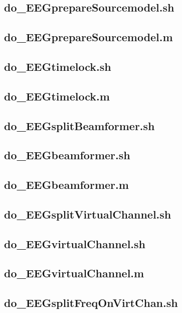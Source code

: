 \documentclass[12pt,a4paper]{scrartcl}
\begin{document}
\subsection{do\_EEGprepareSourcemodel.sh}
\label{sec:prepSM}

\subsection{do\_EEGprepareSourcemodel.m}

\subsection{do\_EEGtimelock.sh}
\label{sec:timelock}

\subsection{do\_EEGtimelock.m}

\subsection{do\_EEGsplitBeamformer.sh}
\label{sec:beamf}

\subsection{do\_EEGbeamformer.sh}

\subsection{do\_EEGbeamformer.m}

\subsection{do\_EEGsplitVirtualChannel.sh}
\label{sec:virtch}

\subsection{do\_EEGvirtualChannel.sh}

\subsection{do\_EEGvirtualChannel.m}

\subsection{do\_EEGsplitFreqOnVirtChan.sh}
\label{sec:freqVirt}
\end{document}
